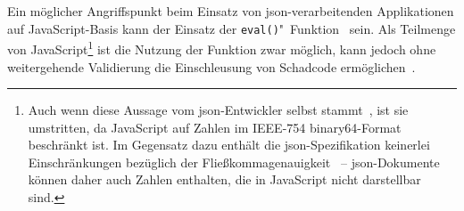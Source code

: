 Ein möglicher Angriffspunkt beim Einsatz von \acrshort{json}-verarbeitenden Applikationen auf JavaScript-Basis kann der Einsatz der \texttt{eval()}"~Funktion~\cite[Abschnitt 18.2.1]{ecma262} sein. Als Teilmenge von JavaScript\footnote{Auch wenn diese Aussage vom \acrshort{json}-Entwickler selbst stammt~\cite{crockford2006fatfree}, ist sie umstritten, da JavaScript auf Zahlen im IEEE-754 binary64-Format~\cite[Abschnitt 6.1.6]{ecma262} beschränkt ist. Im Gegensatz dazu enthält die \acrshort{json}-Spezifikation keinerlei Einschränkungen bezüglich der Fließkommagenauigkeit~\cite[Abschnitt 8]{ecma404} -- \acrshort{json}-Dokumente können daher auch Zahlen enthalten, die in JavaScript nicht darstellbar sind.} ist die Nutzung der Funktion zwar möglich, kann jedoch ohne weitergehende Validierung die Einschleusung von Schadcode ermöglichen~\cite[Abschn.~12]{rfc7159}.
